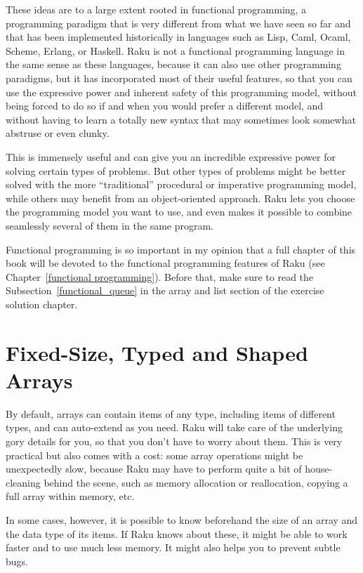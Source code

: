 These ideas are to a large extent rooted in functional 
programming, a programming paradigm that is very different 
from what we have seen so far and that has been implemented 
historically in languages such as Lisp, Caml, Ocaml, Scheme, 
Erlang, or Haskell. Raku is not a functional 
programming language in the same sense as these languages, 
because it can also use other programming paradigms, 
but it has incorporated most of their useful features, so 
that you can use the expressive power and inherent safety 
of this programming model, without being forced to do so 
if and when you would prefer a different model, and
without having to learn a totally new syntax that may 
sometimes look somewhat abstruse or even clunky.

This is immensely useful and can give you an incredible 
expressive power for solving certain types of problems. But 
other types of problems might be better solved with the more 
``traditional'' procedural or imperative programming model, 
while others may benefit from an object-oriented approach. Raku 
lets you choose the programming model you want to use, and even 
makes it possible to combine seamlessly several of them in the 
same program.

Functional programming is so important in my opinion that a full chapter 
of this book will be devoted to the functional programming 
features of Raku (see Chapter~\ref{functional programming}). 
Before that, make sure to read the Subsection~\ref{functional_queue} 
in the array and list section of the exercise solution chapter.

\section{Fixed-Size, Typed and Shaped Arrays}

By default, arrays can contain items of any type, including 
items of different types, and can auto-extend as you need. 
Raku will take care of the underlying gory details for you, 
so that you don't have to worry about them. This is very 
practical but also comes with a cost: some array 
operations might be unexpectedly slow, because Raku may 
have to perform quite a bit of house-cleaning behind the 
scene, such as memory allocation or reallocation, copying 
a full array within memory, etc.

In some cases, however, it is possible to know beforehand 
the size of an array and the data type of its items. If 
Raku knows about these, it might be able to work faster and 
to use much less memory. It might also helps you 
to prevent subtle bugs.

